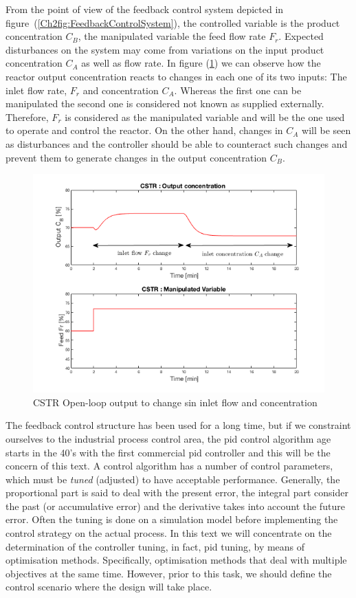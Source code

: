 From the point of view of the feedback control system depicted in figure~(\ref{Ch2fig:FeedbackControlSystem}), the controlled variable is the product concentration $C_B$, the manipulated variable  the feed flow rate $F_r$. Expected disturbances on the system  may come from variations on the input product concentration $C_A$ as well as flow rate. In figure (\ref{Ch2fig:CSTRFigureOpenLoop}) we can observe how the reactor output concentration reacts to changes in each one of its two inputs: The inlet flow rate, $F_r$ and concentration $C_A$. Whereas the first one can be manipulated the second one is considered not known as supplied externally. Therefore, $F_r$ is considered as the manipulated variable and will be the one used to operate and control the reactor. On the other hand, changes in $C_A$ will be seen as disturbances and the controller should be able to counteract such changes and prevent them to generate changes in the output concentration $C_B$. 
%
\begin{figure}[tb]
\centering
\includegraphics[width=\linewidth]{../figuras/Ch2FigureOpenLoop}
\caption{CSTR Open-loop output to change sin inlet flow and concentration} 
\label{Ch2fig:CSTRFigureOpenLoop}
\end{figure}

The feedback control structure has been used for a long time, but if we constraint ourselves to the industrial process control area, the \gls{pid} control algorithm age starts in the 40's  with the first commercial \gls{pid} controller and this will be the concern of this text.  A control algorithm has a number of control parameters, which must be \emph{tuned} (adjusted) to have acceptable performance. Generally, the proportional part is said to deal with the present error, the integral part consider the past (or accumulative error) and the derivative takes into account the future error. Often the tuning is done on a simulation model before implementing the control strategy on the actual process. In this text we will concentrate on the determination of the controller tuning, in fact, \gls{pid} tuning, by means of optimisation methods. Specifically, optimisation methods that deal with multiple objectives at the same time. However, prior to this task, we should define the control scenario where the design will take place.

